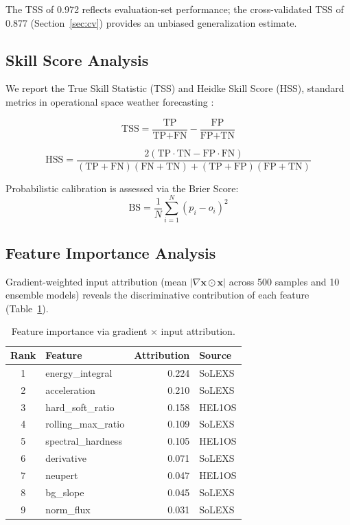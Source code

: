 \documentclass[twocolumn,10pt]{article}
\begin{document}
The TSS of 0.972 reflects evaluation-set performance; the cross-validated TSS of 0.877 (Section~\ref{sec:cv}) provides an unbiased generalization estimate.

\subsection{Skill Score Analysis}\label{sec:skill}

We report the True Skill Statistic (TSS) and Heidke Skill Score (HSS), standard metrics in operational space weather forecasting \citep{barnes2008,bloomfield2012}:

\begin{equation}\label{eq:tss}
\text{TSS} = \frac{\text{TP}}{\text{TP}+\text{FN}} - \frac{\text{FP}}{\text{FP}+\text{TN}}
\end{equation}

\begin{equation}\label{eq:hss}
\text{HSS} = \frac{2(\text{TP} \cdot \text{TN} - \text{FP} \cdot \text{FN})}{(\text{TP}+\text{FN})(\text{FN}+\text{TN}) + (\text{TP}+\text{FP})(\text{FP}+\text{TN})}
\end{equation}

Probabilistic calibration is assessed via the Brier Score:
\begin{equation}\label{eq:brier}
\text{BS} = \frac{1}{N} \sum_{i=1}^{N} (p_i - o_i)^2
\end{equation}

\subsection{Feature Importance Analysis}\label{sec:importance}

Gradient-weighted input attribution (mean $|\nabla \mathbf{x} \odot \mathbf{x}|$ across 500 samples and 10 ensemble models) reveals the discriminative contribution of each feature (Table~\ref{tab:importance}).

\begin{table}[htbp]
\centering
\caption{Feature importance via gradient $\times$ input attribution.}
\label{tab:importance}
\footnotesize
\begin{tabular}{@{}clrl@{}}
\toprule
Rank & Feature & Attribution & Source \\
\midrule
1 & energy\_integral & 0.224 & SoLEXS \\
2 & acceleration & 0.210 & SoLEXS \\
3 & hard\_soft\_ratio & 0.158 & HEL1OS \\
4 & rolling\_max\_ratio & 0.109 & SoLEXS \\
5 & spectral\_hardness & 0.105 & HEL1OS \\
6 & derivative & 0.071 & SoLEXS \\
7 & neupert & 0.047 & HEL1OS \\
8 & bg\_slope & 0.045 & SoLEXS \\
9 & norm\_flux & 0.031 & SoLEXS \\
\bottomrule
\end{tabular}
\end{table}
\end{document}
